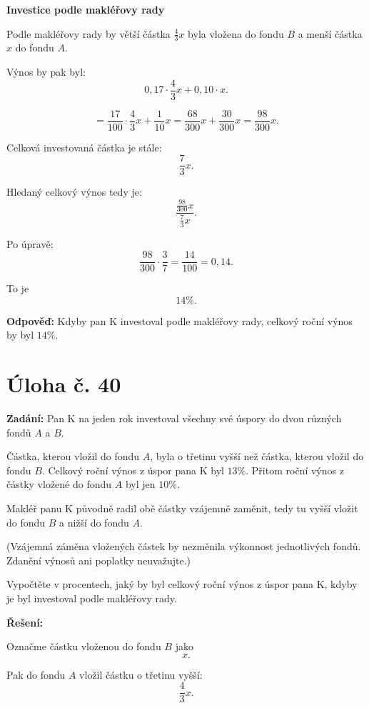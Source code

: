\documentclass[12pt,a4paper]{article}
\begin{document}
\bigskip

\textbf{Investice podle makléřovy rady}

Podle makléřovy rady by větší částka \(\frac{4}{3}x\) byla vložena do fondu \(B\) a menší částka \(x\) do fondu \(A\).

Výnos by pak byl:
\[
0{,}17\cdot \frac{4}{3}x + 0{,}10\cdot x.
\]

\[
=\frac{17}{100}\cdot \frac{4}{3}x+\frac{1}{10}x
=\frac{68}{300}x+\frac{30}{300}x
=\frac{98}{300}x.
\]

Celková investovaná částka je stále:
\[
\frac{7}{3}x.
\]

Hledaný celkový výnos tedy je:
\[
\frac{\frac{98}{300}x}{\frac{7}{3}x}.
\]

Po úpravě:
\[
\frac{98}{300}\cdot \frac{3}{7}
=\frac{14}{100}=0{,}14.
\]

To je
\[
14\%.
\]

\bigskip

\textbf{Odpověď:}  
Kdyby pan K investoval podle makléřovy rady, celkový roční výnos by byl \(14\%\).


\newpage
\section*{Úloha č. 40}

\textbf{Zadání:}  
Pan K na jeden rok investoval všechny své úspory do dvou různých fondů \(A\) a \(B\).

Částka, kterou vložil do fondu \(A\), byla o třetinu vyšší než částka, kterou vložil do fondu \(B\).  
Celkový roční výnos z úspor pana K byl \(13\%\). Přitom roční výnos z částky vložené do fondu \(A\) byl jen \(10\%\).

Makléř panu K původně radil obě částky vzájemně zaměnit, tedy tu vyšší vložit do fondu \(B\) a nižší do fondu \(A\).

(Vzájemná záměna vložených částek by nezměnila výkonnost jednotlivých fondů. Zdanění výnosů ani poplatky neuvažujte.)

Vypočtěte v procentech, jaký by byl celkový roční výnos z úspor pana K, kdyby je byl investoval podle makléřovy rady.

\bigskip

\textbf{Řešení:}

Označme částku vloženou do fondu \(B\) jako
\[
x.
\]

Pak do fondu \(A\) vložil částku o třetinu vyšší:
\[
\frac{4}{3}x.
\]
\end{document}
